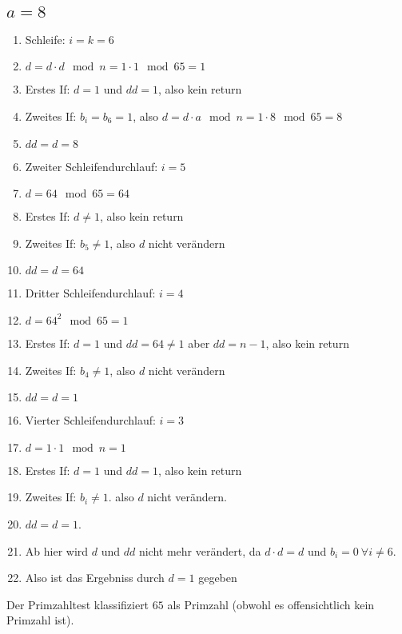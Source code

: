 \documentclass[DIN, pagenumber=false, fontsize=11pt, parskip=half]{scrartcl}
\begin{document}
    \subsection{$a=8$}
    \begin{enumerate}
        \item Schleife: $i=k=6$
        \item $d = d \cdot d \mod n = 1 \cdot 1 \mod 65 = 1$
        \item Erstes If: $d=1$ und $dd=1$, also kein return
        \item Zweites If: $b_i = b_6 = 1$, also $d = d \cdot a \mod n = 1 \cdot 8 \mod 65 = 8$
        \item $dd=d=8$
        \item Zweiter Schleifendurchlauf: $i=5$
        \item $d = 64 \mod 65 = 64$  
        \item Erstes If: $d \neq 1$, also kein return
        \item Zweites If: $b_5 \neq 1$, also $d$ nicht verändern
        \item $dd = d = 64$
        \item Dritter Schleifendurchlauf: $i=4$
        \item $d = 64^2 \mod 65 = 1$
        \item Erstes If: $d=1$ und $dd = 64 \neq 1$ aber $dd = n-1$, also kein return
        \item Zweites If: $b_4 \neq 1$, also $d$ nicht verändern
        \item $dd = d = 1$
        \item Vierter Schleifendurchlauf: $i=3$
        \item $d = 1 \cdot 1 \mod n = 1$
        \item Erstes If: $d=1$ und $dd=1$, also kein return
        \item Zweites If: $b_i \neq 1$. also $d$ nicht verändern.
        \item $dd = d= 1$.
        \item Ab hier wird $d$ und $dd$ nicht mehr verändert, da $d \cdot d = d$ und $b_i = 0\ \forall i \neq 6$.
        \item Also ist das Ergebniss durch $d=1$ gegeben
    \end{enumerate} 
    Der Primzahltest klassifiziert $65$ als Primzahl (obwohl es offensichtlich kein
    Primzahl ist).
    
\end{document}
